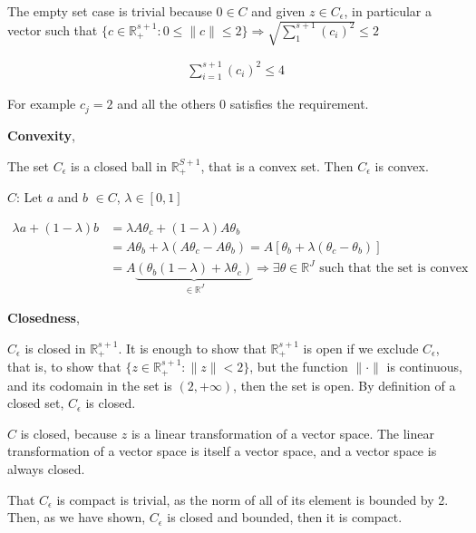 \documentclass[answers]{exam}
\theoremstyle{definition}
\begin{document}
\begin{questions}
\begin{parts}
\begin{solution}
        The empty set case is trivial because $0 \in C$ and given $z\in C_\epsilon$, in particular a vector such that $\{c\in\mathds{R}_{+}^{s+1}:0\leq\parallel c\parallel\leq 2\}\Rightarrow \sqrt{\sum_{1}^{s+1}(c_i)^2}\leq 2$
            
            \begin{align*}
                \sum_{i=1}^{s+1}(c_i)^2 \leq 4
            \end{align*}
            
        For example $c_j=2$ and all the others $0$ satisfies the requirement.
        
        \textbf{Convexity},
        
        The set $C_\epsilon$ is a closed ball in $\mathds{R}^{S+1}_{+}$, that is a convex set. Then $C_\epsilon$ is convex.
        
        $C$: Let $a$ and $b$ $\in C$, $\lambda \in [0,1]$
        
            \begin{align*}
                \lambda a+(1-\lambda)b&=\lambda A\theta_c+(1-\lambda)A\theta_b\\
                &=A\theta_b+\lambda(A\theta_c-A\theta_b)=A[\theta_b+\lambda(\theta_c-\theta_b)]\\
                &=A\underbrace{(\theta_b(1-\lambda)+\lambda\theta_c)}_{\in\mathds{R}^{J}}\Rightarrow\exists\theta\in\mathds{R}^{J}\text{ such that the set is convex}
            \end{align*}
            
        \textbf{Closedness},
        
        $C_\epsilon$ is closed in $\mathds{R}_+^{s+1}$. It is enough to show that $\mathds{R}_+^{s+1}$ is open if we exclude $C_\epsilon$, that is, to show that $\{z\in\mathds{R}_+^{s+1}:\parallel z\parallel<2\}$, but the function $\parallel\cdot\parallel$ is continuous, and its codomain in the set is $(2,+\infty)$, then the set is open. By definition of a closed set, $C_\epsilon$ is closed.
        
        $C$ is closed, because $z$ is a linear transformation of a vector space. The linear transformation of a vector space is itself a vector space, and a vector space is always closed.
        
        That $C_\epsilon$ is compact is trivial, as the norm of all of its element is bounded by 2. Then, as we have shown, $C_\epsilon$ is closed and bounded, then it is compact.
    
    \end{solution}
        

\end{parts}
\end{questions}
\end{document}
